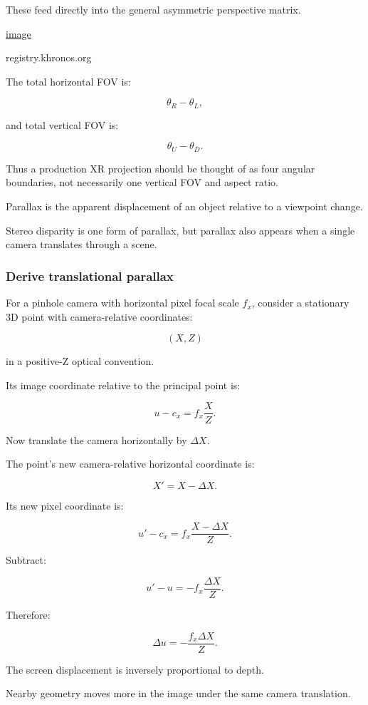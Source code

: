 These feed directly into the general asymmetric perspective matrix. 

\href{https://www.google.com/s2/favicons?domain=https://registry.khronos.org&sz=32}{image}

registry.khronos.org

The total horizontal FOV is:

\[ \theta_R-\theta_L, \]

and total vertical FOV is:

\[ \theta_U-\theta_D. \]

Thus a production XR projection should be thought of as four angular boundaries, not necessarily one vertical FOV and aspect ratio.

Parallax is the apparent displacement of an object relative to a viewpoint change.

Stereo disparity is one form of parallax, but parallax also appears when a single camera translates through a scene.

\subsubsection{Derive translational parallax}\label{derive-translational-parallax}

For a pinhole camera with horizontal pixel focal scale \(f_x\), consider a stationary 3D point with camera-relative coordinates:

\[ (X,Z) \]

in a positive-Z optical convention.

Its image coordinate relative to the principal point is:

\[ u-c_x=f_x\frac XZ. \]

Now translate the camera horizontally by \(\Delta X\).

The point's new camera-relative horizontal coordinate is:

\[ X'=X-\Delta X. \]

Its new pixel coordinate is:

\[ u'-c_x=f_x\frac{X-\Delta X}{Z}. \]

Subtract:

\[ u'-u=-f_x\frac{\Delta X}{Z}. \]

Therefore:

\[ \boxed{ \Delta u=-\frac{f_x\Delta X}{Z}. } \]

The screen displacement is inversely proportional to depth.

Nearby geometry moves more in the image under the same camera translation.

